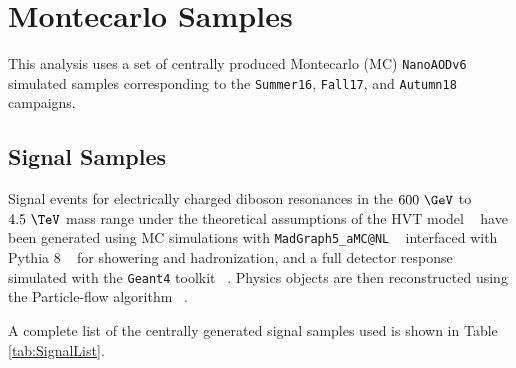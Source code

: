 \section{Montecarlo Samples}

This analysis uses a set of centrally produced Montecarlo (MC) \verb|NanoAODv6|
simulated samples corresponding to the \verb|Summer16|, \verb|Fall17|,
and \verb|Autumn18| campaigns.

\subsection {Signal Samples}

Signal events for electrically charged diboson resonances in the $600~\GeV$
to $4.5~\TeV$ mass range under the theoretical assumptions of the HVT model ~\cite{hvt2014}
have been generated using MC simulations with \verb|MadGraph5_aMC@NL| ~\cite{madgraph}
interfaced with Pythia 8 ~\cite{pythia} for showering and hadronization, and a
full detector response simulated with the \verb|Geant4| toolkit ~\cite{geant4}.
Physics objects are then reconstructed using the Particle-flow
algorithm ~\cite{particleflow}.

A complete list of the centrally generated signal samples used is shown in
Table \ref{tab:SignalList}.

